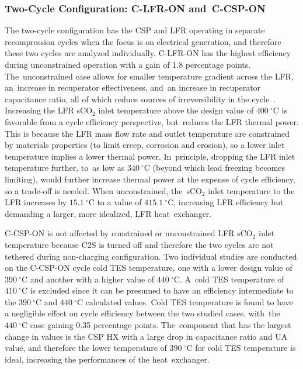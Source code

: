 \documentclass[sustainability,article,accept,moreauthors,pdftex]{Definitions/mdpi}
\begin{document}
\begin{paracol}{2}
\switchcolumn


\subsubsection{Two-Cycle Configuration: C-LFR-ON and~C-CSP-ON}

The two-cycle configuration has the CSP and LFR operating in separate recompression cycles when the focus is on electrical generation, and therefore these two cycles are analyzed individually. C-LFR-ON has the highest efficiency during unconstrained operation with a gain of 1.8 percentage points. The~unconstrained case allows for smaller temperature gradient across the LFR, an~increase in recuperator effectiveness, and~an increase in recuperator capacitance ratio, all of which reduce sources of irreversibility in the cycle~\cite{klein_nellis_2011}. Increasing the LFR sCO$_2$ inlet temperature above the design value of $400~^{\circ}$C is favorable from a cycle efficiency perspective, but~reduces the LFR thermal power. This is because the LFR mass flow rate and outlet temperature are constrained by materials properties (to limit creep, corrosion and erosion), so a lower inlet temperature implies a lower thermal power. In~principle, dropping the LFR inlet temperature further, to~as low as $340~^{\circ}$C (beyond which lead freezing becomes limiting), would further increase thermal power at the expense of cycle efficiency, so a trade-off is needed. When unconstrained, the~sCO$_2$ inlet temperature to the LFR increases by $15.1~^{\circ}$C to a value of $415.1~^{\circ}$C, increasing LFR efficiency but demanding a larger, more idealized, LFR heat~exchanger.

C-CSP-ON is not affected by constrained or unconstrained LFR sCO$_2$ inlet temperature because C2S is turned off and therefore the two cycles are not tethered during non-charging configuration. Two individual studies are conducted on the C-CSP-ON cycle cold TES temperature, one with a lower design value of $390~^{\circ}$C and another with a higher value of $440~^{\circ}$C. A~cold TES temperature of $410~^{\circ}$C is excluded since it can be presumed to have an efficiency intermediate to the $390~^{\circ}$C and $440~^{\circ}$C calculated values. Cold TES temperature is found to have a negligible effect on cycle efficiency between the two studied cases, with~the $440~^{\circ}$C case gaining 0.35 percentage points. The~component that has the largest change in values is the CSP HX with a large drop in capacitance ratio and UA value, and therefore the lower temperature of $390~^{\circ}$C for cold TES temperature is ideal, increasing the performances of the heat~exchanger. 


\end{paracol}
\end{document}
